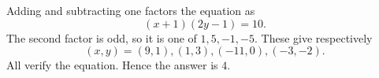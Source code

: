 Adding and subtracting one factors the equation as
\[
(x+1)(2y-1)=10.
\]
The second factor is odd, so it is one of $1,5,-1,-5$. These give respectively
\[
(x,y)=(9,1),(1,3),(-11,0),(-3,-2).
\]
All verify the equation. Hence the answer is $\boxed4$.
